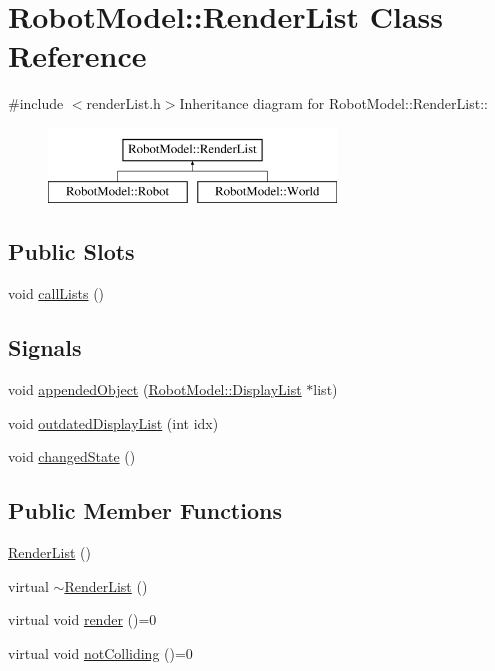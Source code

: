 \hypertarget{class_robot_model_1_1_render_list}{
\section{RobotModel::RenderList Class Reference}
\label{class_robot_model_1_1_render_list}
}


{\ttfamily \#include $<$renderList.h$>$}Inheritance diagram for RobotModel::RenderList::\begin{figure}[H]
\begin{center}
\leavevmode
\includegraphics[height=2cm]{class_robot_model_1_1_render_list}
\end{center}
\end{figure}
\subsection*{Public Slots}
\begin{DoxyCompactItemize}
\item 
void \hyperlink{class_robot_model_1_1_render_list_a7cd62d6e6376bc02bd4244dcc174b465}{callLists} ()
\end{DoxyCompactItemize}
\subsection*{Signals}
\begin{DoxyCompactItemize}
\item 
void \hyperlink{class_robot_model_1_1_render_list_a635908222fa71402918e31eb2d725844}{appendedObject} (\hyperlink{class_robot_model_1_1_display_list}{RobotModel::DisplayList} $\ast$list)
\item 
void \hyperlink{class_robot_model_1_1_render_list_a22724d5d6878f19b639b5b6b16963ee2}{outdatedDisplayList} (int idx)
\item 
void \hyperlink{class_robot_model_1_1_render_list_a9ad71d6ea6d0d1008e0705ced20f6aea}{changedState} ()
\end{DoxyCompactItemize}
\subsection*{Public Member Functions}
\begin{DoxyCompactItemize}
\item 
\hyperlink{class_robot_model_1_1_render_list_a98651fa6cd408cce14d6d245cd95fde4}{RenderList} ()
\item 
virtual \hyperlink{class_robot_model_1_1_render_list_ae66a9f72d814771e42d7e50946053ef7}{$\sim$RenderList} ()
\item 
virtual void \hyperlink{class_robot_model_1_1_render_list_ac8646765beee22bf11582049dc3cf195}{render} ()=0
\item 
virtual void \hyperlink{class_robot_model_1_1_render_list_a78436c997913ce9ad41a9bd1da9b3d96}{notColliding} ()=0
\end{DoxyCompactItemize}


